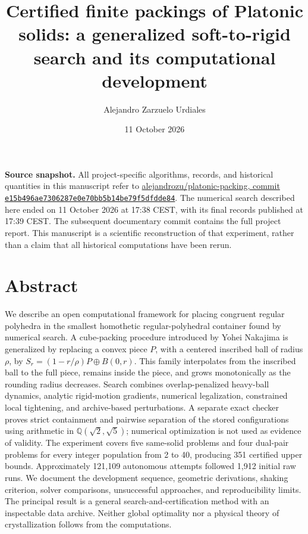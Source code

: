 \documentclass[11pt,a4paper]{article}
\title{Certified finite packings of Platonic solids: a generalized soft-to-rigid search and its computational development}
\author{Alejandro Zarzuelo Urdiales}
\date{11 October 2026}
\begin{document}
\maketitle


\textbf{Source snapshot.} All project-specific algorithms, records, and historical quantities in this manuscript refer to \href{https://github.com/alejandrozu/platonic-packing/tree/e15b496ae7306287e0e70bb5b14be79f5dfdde84}{alejandrozu/platonic-packing, commit \nolinkurl{e15b496ae7306287e0e70bb5b14be79f5dfdde84}}. The numerical search described here ended on 11 October 2026 at 17:38 CEST, with its final records published at 17:39 CEST. The subsequent documentary commit contains the full project report. This manuscript is a scientific reconstruction of that experiment, rather than a claim that all historical computations have been rerun.

\section*{Abstract}

We describe an open computational framework for placing congruent regular polyhedra in the smallest homothetic regular-polyhedral container found by numerical search. A cube-packing procedure introduced by Yohei Nakajima is generalized by replacing a convex piece \(P\), with a centered inscribed ball of radius \(\rho\), by \(S_r=(1-r/\rho)P\oplus B(0,r)\). This family interpolates from the inscribed ball to the full piece, remains inside the piece, and grows monotonically as the rounding radius decreases. Search combines overlap-penalized heavy-ball dynamics, analytic rigid-motion gradients, numerical legalization, constrained local tightening, and archive-based perturbations. A separate exact checker proves strict containment and pairwise separation of the stored configurations using arithmetic in \(\mathbb Q(\sqrt2,\sqrt5)\); numerical optimization is not used as evidence of validity. The experiment covers five same-solid problems and four dual-pair problems for every integer population from 2 to 40, producing 351 certified upper bounds. Approximately 121,109 autonomous attempts followed 1,912 initial raw runs. We document the development sequence, geometric derivations, shaking criterion, solver comparisons, unsuccessful approaches, and reproducibility limits. The principal result is a general search-and-certification method with an inspectable data archive. Neither global optimality nor a physical theory of crystallization follows from the computations.
\end{document}
